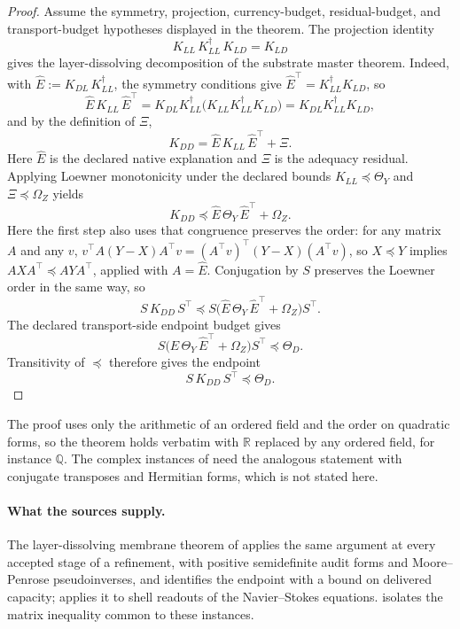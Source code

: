 \begin{proof}
Assume the symmetry, projection, currency-budget, residual-budget,
and transport-budget hypotheses displayed in the theorem.  The
projection identity
\[
  K_{LL}\,K_{LL}^{\dagger}\,K_{LD}=K_{LD}
\]
gives the layer-dissolving decomposition of the substrate master theorem.
Indeed, with \(\widehat E:=K_{DL}\,K_{LL}^{\dagger}\), the symmetry conditions
give \(\widehat E^{\!\top}=K_{LL}^{\dagger}K_{LD}\), so
\[
  \widehat E\,K_{LL}\,\widehat E^{\!\top}
  =K_{DL}K_{LL}^{\dagger}\bigl(K_{LL}K_{LL}^{\dagger}K_{LD}\bigr)
  =K_{DL}K_{LL}^{\dagger}K_{LD},
\]
and by the definition of \(\Xi\),
\[
  K_{DD}
  =
  \widehat E\,K_{LL}\,\widehat E^{\!\top}
  +\Xi.
\]
Here \(\widehat E\) is the declared native explanation and \(\Xi\) is
the adequacy residual.  Applying Loewner monotonicity under the
declared bounds \(K_{LL}\preceq\Theta_Y\) and
\(\Xi\preceq\Omega_Z\) yields
\[
  K_{DD}
  \preceq
  \widehat E\,\Theta_Y\,\widehat E^{\!\top}+\Omega_Z .
\]
Here the first step also uses that congruence preserves the order: for any
matrix \(A\) and any \(v\),
\(v^{\!\top}A(Y-X)A^{\!\top}v=(A^{\!\top}v)^{\!\top}(Y-X)(A^{\!\top}v)\), so
\(X\preceq Y\) implies \(AXA^{\!\top}\preceq AYA^{\!\top}\), applied with
\(A=\widehat E\). Conjugation by \(S\) preserves the Loewner order in the same
way, so
\[
  S\,K_{DD}\,S^{\!\top}
  \preceq
  S\bigl(\widehat E\,\Theta_Y\,\widehat E^{\!\top}
    +\Omega_Z\bigr)S^{\!\top}.
\]
The declared transport-side endpoint budget gives
\[
  S\bigl(\widehat E\,\Theta_Y\,\widehat E^{\!\top}
    +\Omega_Z\bigr)S^{\!\top}
  \preceq \Theta_D .
\]
Transitivity of \(\preceq\) therefore gives the endpoint
\[
  S\,K_{DD}\,S^{\!\top}\preceq\Theta_D .
\]

\end{proof}

The proof uses only the arithmetic of an ordered field and the order
on quadratic forms, so the theorem holds verbatim with \(\mathbb R\)
replaced by any ordered field, for instance \(\mathbb Q\).  The complex
instances of \citet{Tsiokos2026NeedleKiller} need the analogous
statement with conjugate transposes and Hermitian forms, which is not
stated here.

\paragraph{What the sources supply.} The layer-dissolving membrane
theorem of \citet{Tsiokos2026NeedleKiller} applies the same argument at
every accepted stage of a refinement, with positive semidefinite audit
forms and Moore--Penrose pseudoinverses, and identifies the endpoint
with a bound on delivered capacity; \citet{Tsiokos2026NavierStokes}
applies it to shell readouts of the Navier--Stokes equations.
 isolates the matrix inequality common to these
instances.

